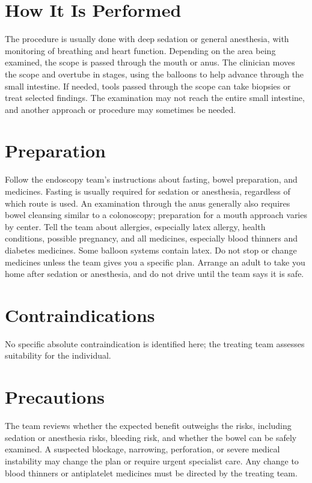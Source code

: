 \section*{How It Is Performed}
The procedure is usually done with deep sedation or general anesthesia, with monitoring of breathing and heart function. Depending on the area being examined, the scope is passed through the mouth or anus. The clinician moves the scope and overtube in stages, using the balloons to help advance through the small intestine. If needed, tools passed through the scope can take biopsies or treat selected findings. The examination may not reach the entire small intestine, and another approach or procedure may sometimes be needed.

\section*{Preparation}
Follow the endoscopy team's instructions about fasting, bowel preparation, and medicines. Fasting is usually required for sedation or anesthesia, regardless of which route is used. An examination through the anus generally also requires bowel cleansing similar to a colonoscopy; preparation for a mouth approach varies by center. Tell the team about allergies, especially latex allergy, health conditions, possible pregnancy, and all medicines, especially blood thinners and diabetes medicines. Some balloon systems contain latex. Do not stop or change medicines unless the team gives you a specific plan. Arrange an adult to take you home after sedation or anesthesia, and do not drive until the team says it is safe.

\section*{Contraindications}
No specific absolute contraindication is identified here; the treating team assesses suitability for the individual.

\section*{Precautions}
The team reviews whether the expected benefit outweighs the risks, including sedation or anesthesia risks, bleeding risk, and whether the bowel can be safely examined. A suspected blockage, narrowing, perforation, or severe medical instability may change the plan or require urgent specialist care. Any change to blood thinners or antiplatelet medicines must be directed by the treating team.

